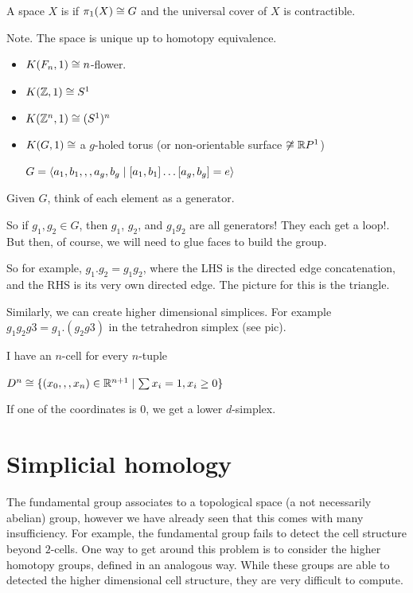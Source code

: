 \documentclass[11pt,leqno,oneside]{amsart}
\newenvironment{dateenv}{
  \vspace{1em}
}{
  \vspace{1em}
}
\newcommand{\mydate}[4]{
  \newdate{#1}{#2}{#3}{#4}
  \begin{dateenv}
    \hfill\displaydate{#1}
  \end{dateenv}
}
\numberwithin{thm}{section}
\newcommand{\fund}[1][1]{\pi_{#1}}
\begin{document}
\begin{defn}
  A space $X$ is  if $\fund(X) \isom G$ and the universal cover of $X$ is contractible.
\end{defn}
Note.  The space is unique up to homotopy equivalence.
\begin{example}
  \begin{itemize}
    \item
    $K(F_n, 1) \mathrel{\cong} n$-flower.

    \item
    $K({\mathbb Z}, 1) \mathrel{\cong} S^1$

    \item
    $K({\mathbb Z}^n, 1) \mathrel{\cong} (S^1)^n$

    \item
    $K(G, 1) \mathrel{\cong}$ a $g$-holed torus (or non-orientable surface $\not\mathrel{\cong} {\mathbb R} P^1$)

    $G = \langle a_1,b_1,,,a_g,b_g \mid [a_1,b_1]\ldots[a_g,b_g] = e \rangle$
  \end{itemize}
\end{example}

Given $G$, think of each element as a generator.

So if $g_1, g_2 \in G$, then $g_1$, $g_2$, and $g_1g_2$ are all generators!  They each get a loop!.  But then, of course, we will need to glue faces to build the group.


So for example, $g_1.g_2 = g_1g_2$, where the LHS is the directed edge concatenation, and the RHS is its very own directed edge.  The picture for this is the triangle.

Similarly, we can create higher dimensional simplices.  For example
$g_1g_2g3 = g_1.(g_2g3)$
in the tetrahedron simplex (see pic).

I have an $n$-cell for every $n$-tuple

$D^n \mathrel{\cong} \{ (x_0,,,x_n) \in {\mathbb R}^{n+1} \mid \sum x_i = 1, x_i \geq 0 \}$

If one of the coordinates is 0, we get a lower $d$-simplex.





\mydate{d13}{24}{2}{2017}

\section*{Simplicial homology}

The fundamental group associates to a topological space (a not
necessarily abelian) group, however we have already seen that this
comes with many insufficiency. For example, the fundamental group
fails to detect the cell structure beyond \(2\)-cells. One way to get
around this problem is to consider the higher homotopy groups, defined
in an analogous way. While these groups are able to detected the
higher dimensional cell structure, they are very difficult to compute.
\end{document}
